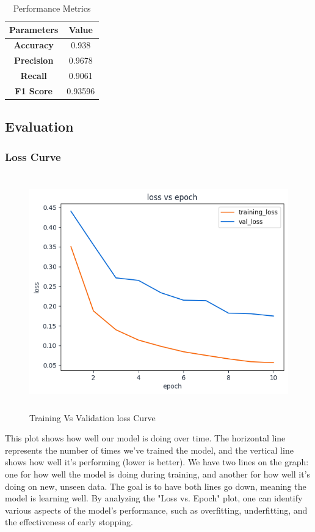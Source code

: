 \begin{table}[h]
    \centering
    \renewcommand{\arraystretch}{1.5} %
    \begin{tabular}{|c|c|}
        \hline
        \textbf{Parameters} & \textbf{Value} \\
        \hline
        \textbf{Accuracy}   & 0.938          \\
        \hline
        \textbf{Precision}  & 0.9678         \\
        \hline
        \textbf{Recall}     & 0.9061         \\
        \hline
        \textbf{F1 Score}   & 0.93596        \\
        \hline
    \end{tabular}
    \caption{Performance Metrics}
    \label{tab:metrics}
\end{table}





\newpage
\subsection{Evaluation}
\subsubsection{Loss Curve}
\begin{figure}[ht]
    \centering
    \includegraphics[width= 5in, height =4in ]{img/lossVsAccuracy.png}
    \caption{{Training Vs Validation loss Curve}}
\end{figure}
\noindent This plot shows how well our model is doing over time. The horizontal line represents the number of times we've trained the model, and the vertical line shows how well it's performing (lower is better). We have two lines on the graph: one for how well the model is doing during training, and another for how well it's doing on new, unseen data. The goal is to have both lines go down, meaning the model is learning well. By analyzing the "Loss vs. Epoch" plot, one can identify various aspects of the model's performance, such as overfitting, underfitting, and the effectiveness of early stopping.

